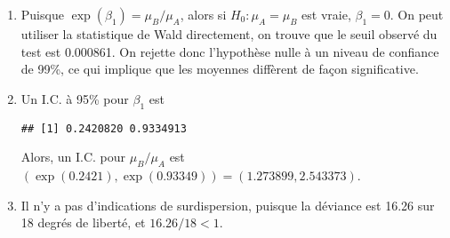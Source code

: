 \begin{solution}{6.4}
\begin{enumerate}
\begin{knitrout}
\begin{kframe}
\begin{verbatim}
## (Intercept)   1.6094     0.1414  11.380  < 2e-16 ***
## x             0.5878     0.1764   3.332 0.000861 ***
## ---
## Signif. codes:
## 0 '***' 0.001 '**' 0.01 '*' 0.05 '.' 0.1 ' ' 1
##
## (Dispersion parameter for poisson family taken to be 1)
##
##     Null deviance: 27.857  on 19  degrees of freedom
## Residual deviance: 16.268  on 18  degrees of freedom
## AIC: 94.349
##
## Number of Fisher Scoring iterations: 4
\end{verbatim}
\begin{alltt}
\hlstd{(}\hlstd{(y[}\hlopt{==}\hlstd{)])}\hlopt{/}\hlstd{(y[}\hlopt{==}\hlstd{)]))}
\end{alltt}
\begin{verbatim}
## [1] 0.5877867
\end{verbatim}
\end{kframe}
\end{knitrout}

\item Puisque $\exp(\beta_1)=\mu_B/\mu_A$, alors si $H_0: \mu_A=\mu_B$ est vraie, $\beta_1=0$. On peut utiliser la statistique de Wald directement, on trouve que le seuil observé du test est 0.000861. On rejette donc l'hypothèse nulle à un niveau de confiance de 99\%, ce qui implique que les moyennes diffèrent de façon significative.

\item Un I.C. à 95\% pour $\beta_1$ est
\begin{knitrout}
\color{fgcolor}\begin{kframe}
\begin{alltt}
\hlopt{$}\hlstd{coef[}\hlstd{]}\hlopt{+}\hlstd{(}\hlopt{-}\hlstd{,}\hlstd{)}\hlopt{*}\hlstd{(}\hlstd{)}\hlopt{*}\hlopt{$}\hlstd{coefficients[}\hlstd{,}\hlstd{]}
\end{alltt}
\begin{verbatim}
## [1] 0.2420820 0.9334913
\end{verbatim}
\end{kframe}
\end{knitrout}

Alors, un I.C. pour $\mu_B/\mu_A$ est $(\exp(0.2421),\exp(0.93349))=(1.273899 , 2.543373)$.

\item Il n'y a pas d'indications de surdispersion, puisque la déviance est 16.26 sur 18 degrés de liberté, et $16.26/18<1$.


\end{enumerate}
\end{solution}
